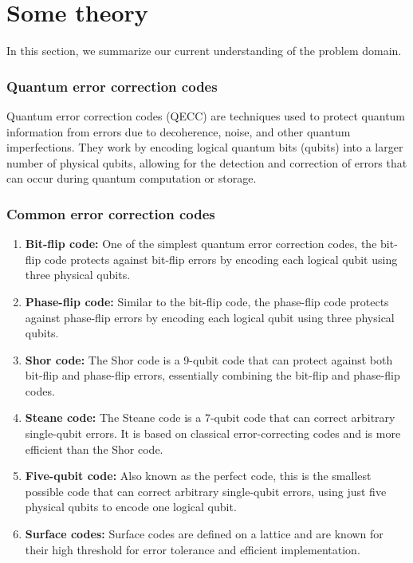 \section{Some theory}

In this section, we summarize our current understanding of the problem domain.

\subsubsection*{Quantum error correction codes}

Quantum error correction codes (QECC) are techniques used to protect quantum information from errors
due to decoherence, noise, and other quantum imperfections. They work by encoding logical quantum
bits (qubits) into a larger number of physical qubits, allowing for the detection and correction of
errors that can occur during quantum computation or storage.

\subsubsection*{Common error correction codes}

\begin{enumerate}
  \item \textbf{Bit-flip code:} One of the simplest quantum error correction codes, the bit-flip
  code protects against bit-flip errors by encoding each logical qubit using three physical qubits.

  \item \textbf{Phase-flip code:} Similar to the bit-flip code, the phase-flip code protects against
  phase-flip errors by encoding each logical qubit using three physical qubits.

  \item \textbf{Shor code:} The Shor code is a 9-qubit code that can protect against both bit-flip
  and phase-flip errors, essentially combining the bit-flip and phase-flip codes.

  \item \textbf{Steane code:} The Steane code is a 7-qubit code that can correct arbitrary
  single-qubit errors. It is based on classical error-correcting codes and is more efficient than
  the Shor code.

  \item \textbf{Five-qubit code:} Also known as the perfect code, this is the smallest possible code
  that can correct arbitrary single-qubit errors, using just five physical qubits to encode one
  logical qubit.

  \item \textbf{Surface codes:} Surface codes are defined on a lattice and are known for their high
  threshold for error tolerance and efficient implementation.
\end{enumerate}


